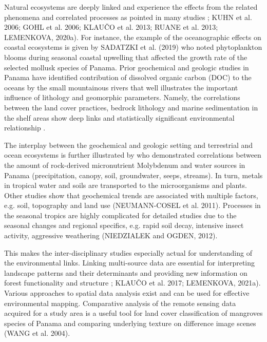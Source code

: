 \documentclass[10pt,twoside,twocolumn,a4paper]{article}
\begin{document}
Natural ecosystems are deeply linked and experience the effects from the related phenomena and correlated processes as pointed in many studies \cite{Benfield,Lee}; KUHN et al. 2006; GOHL et al. 2006; KLAUČO et al. 2013; RUANE et al. 2013; LEMENKOVA, 2020a). For instance, the example of the oceanographic effects on coastal ecosystems is given by SADATZKI et al. (2019) who noted phytoplankton blooms during seasonal coastal upwelling that affected the growth rate of the selected mollusk species of Panama. Prior geochemical and geologic studies in Panama have identified contribution of dissolved organic carbon (DOC) to the oceans by the small mountainous rivers that well illustrates the important influence of lithology and geomorphic parameters. Namely, the correlations between the land cover practices, bedrock lithology and marine sedimentation in the shelf areas show deep links and statistically significant environmental relationship \cite{Goldsmith}.

The interplay between the geochemical and geologic setting and terrestrial and ocean ecosystems is further illustrated by \cite{Gardner} who demonstrated correlations between the amount of rock-derived micronutrient Molybdenum and water sources in Panama (precipitation, canopy, soil, groundwater, seeps, streams). In turn, metals in tropical water and soils are transported to the microorganisms and plants. 
Other studies show that geochemical trends are associated with multiple factors, e.g. soil, topography and land use (NEUMANN-COSEL et al. 2011). Processes in the seasonal tropics are highly complicated for detailed studies due to the seasonal changes and regional specifics, e.g. rapid soil decay, intensive insect activity, aggressive weathering (NIEDZIALEK and OGDEN, 2012). 

This makes the inter-disciplinary studies especially actual for understanding of the environmental links. Linking multi-source data are essential for interpreting landscape patterns and their determinants and providing new information on forest functionality and structure \cite{Higgins}; KLAUČO et al. 2017; LEMENKOVA, 2021a). Various approaches to spatial data analysis exist and can be used for effective environmental mapping. Comparative analysis of the remote sensing data acquired for a study area is a useful tool for land cover classification of mangroves species of Panama and comparing underlying texture on difference image scenes (WANG et al. 2004).
\end{document}
